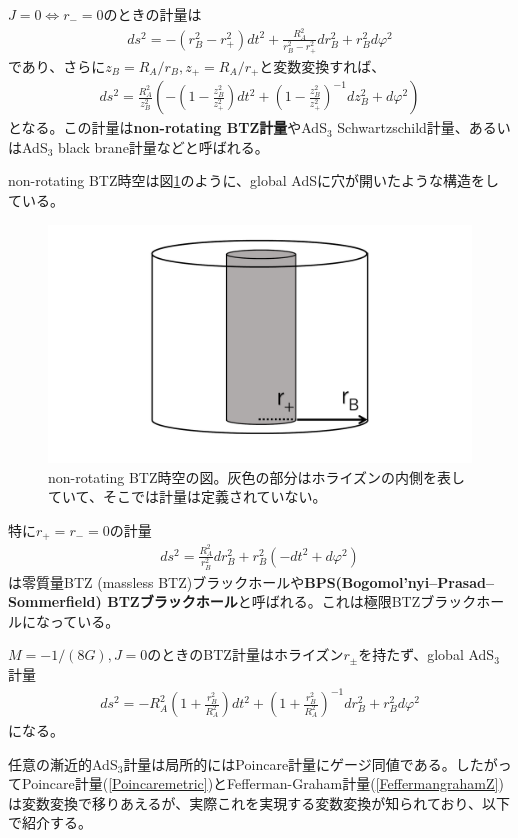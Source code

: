 \begin{oframed}
$J=0\iff r_-=0$のときの計量は
\begin{align}
ds^2=-(r_{B}^2-r_+^2)dt^2+\frac{R_A^2}{r_{B}^2-r_+^2}dr_{B}^2+r_{B}^2d\varphi^2
\end{align}
であり、さらに$z_{B}=R_A/r_{B},z_+=R_A/r_+$と変数変換すれば、
\begin{align}\label{BTZblackbrane}
ds^2=\frac{R_A^2}{z_{B}^2}\left( -\left(1-\frac{z_{B}^2}{z_+^2}\right)dt^2+\left(1-\frac{z_{B}^2}{z_+^2}\right)^{-1}dz_{B}^2+d\varphi^2 \right)
\end{align}
となる。この計量は\textbf{non-rotating BTZ計量}やAdS$_3$ Schwartzschild計量、あるいはAdS$_3$ black brane計量などと呼ばれる。
\end{oframed}
non-rotating BTZ時空は図\ref{fig:btz}のように、global AdSに穴が開いたような構造をしている。
\begin{figure}[h]
	\centering
	\includegraphics[width=0.7\linewidth]{BTZ.pdf}
	\caption{non-rotating BTZ時空の図。灰色の部分はホライズンの内側を表していて、そこでは計量は定義されていない。}
	\label{fig:btz}
\end{figure}

特に$r_+=r_-=0$の計量
\begin{align}\label{BPSBTZ}
ds^2=\frac{R_A^2}{r_{B}^2}dr_{B}^2+r_{B}^2(-dt^2+d\varphi^2)
\end{align}
は零質量BTZ (massless BTZ)ブラックホールや\textbf{BPS(Bogomol'nyi–Prasad–Sommerfield) BTZブラックホール}と呼ばれる。これは極限BTZブラックホールになっている。

$M=-1/(8G),J=0$のときのBTZ計量はホライズン$r_\pm$を持たず、global AdS$_3$計量
\begin{align}
ds^2=-R_A^2\left(1+\frac{r_{B}^2}{R_A^2}\right)dt^2+\left(1+\frac{r_{B}^2}{R_A^2}\right)^{-1}dr_{B}^2+r_{B}^2d\varphi^2
\end{align}
になる。

任意の漸近的AdS$_3$計量は局所的にはPoincare計量にゲージ同値である。したがってPoincare計量(\ref{Poincaremetric})とFefferman-Graham計量(\ref{FeffermangrahamZ})は変数変換で移りあえるが、実際これを実現する変数変換が知られており\cite{Roberts_2012}、以下で紹介する。

